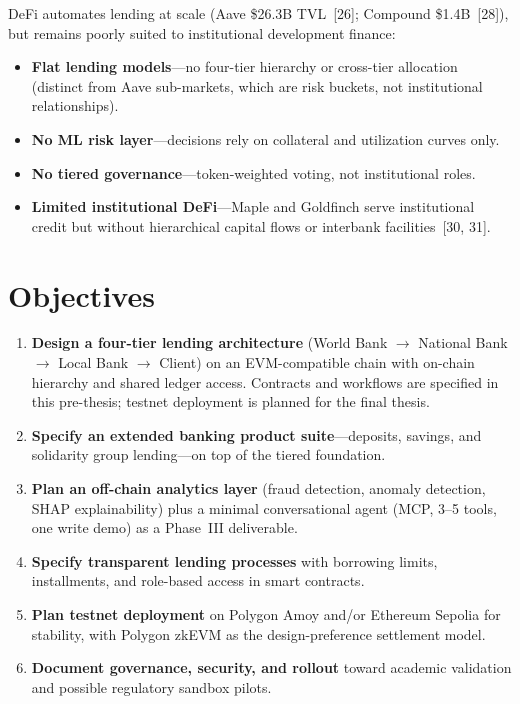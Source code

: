 \documentclass[12pt,a4paper]{report}
\begin{document}
DeFi automates lending at scale (Aave \$26.3B TVL~[26]; Compound \$1.4B~[28]), but remains poorly suited to institutional development finance:
\begin{itemize}[noitemsep]
\item \textbf{Flat lending models}---no four-tier hierarchy or cross-tier allocation (distinct from Aave sub-markets, which are risk buckets, not institutional relationships).
\item \textbf{No ML risk layer}---decisions rely on collateral and utilization curves only.
\item \textbf{No tiered governance}---token-weighted voting, not institutional roles.
\item \textbf{Limited institutional DeFi}---Maple and Goldfinch serve institutional credit but without hierarchical capital flows or interbank facilities~[30, 31].
\end{itemize}

\section{Objectives}

\begin{enumerate}[noitemsep]
\item \textbf{Design a four-tier lending architecture} (World Bank $\to$ National Bank $\to$ Local Bank $\to$ Client) on an EVM-compatible chain with on-chain hierarchy and shared ledger access. Contracts and workflows are specified in this pre-thesis; testnet deployment is planned for the final thesis.
\item \textbf{Specify an extended banking product suite}---deposits, savings, and solidarity group lending---on top of the tiered foundation.
\item \textbf{Plan an off-chain analytics layer} (fraud detection, anomaly detection, SHAP explainability) plus a minimal conversational agent (MCP, 3--5 tools, one write demo) as a Phase~III deliverable.
\item \textbf{Specify transparent lending processes} with borrowing limits, installments, and role-based access in smart contracts.
\item \textbf{Plan testnet deployment} on Polygon Amoy and/or Ethereum Sepolia for stability, with Polygon zkEVM as the design-preference settlement model.
\item \textbf{Document governance, security, and rollout} toward academic validation and possible regulatory sandbox pilots.
\end{enumerate}
\end{document}
